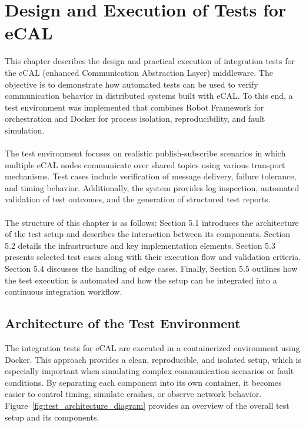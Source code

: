 \clearpage
\section{Design and Execution of Tests for eCAL}

This chapter describes the design and practical execution of integration tests for the eCAL (enhanced Communication Abstraction Layer) middleware. The objective is to demonstrate how automated tests can be used to verify communication behavior in distributed systems built with eCAL. To this end, a test environment was implemented that combines Robot Framework for orchestration and Docker for process isolation, reproducibility, and fault simulation.
\\
\\
The test environment focuses on realistic publish-subscribe scenarios in which multiple eCAL nodes communicate over shared topics using various transport mechanisms. Test cases include verification of message delivery, failure tolerance, and timing behavior. Additionally, the system provides log inspection, automated validation of test outcomes, and the generation of structured test reports.
\\
\\
The structure of this chapter is as follows: Section 5.1 introduces the architecture of the test setup and describes the interaction between its components. Section 5.2 details the infrastructure and key implementation elements. Section 5.3 presents selected test cases along with their execution flow and validation criteria. Section 5.4 discusses the handling of edge cases. Finally, Section 5.5 outlines how the test execution is automated and how the setup can be integrated into a continuous integration workflow.


\subsection{Architecture of the Test Environment}

The integration tests for eCAL are executed in a containerized environment using Docker. This approach provides a clean, reproducible, and isolated setup, which is especially important when simulating complex communication scenarios or fault conditions. By separating each component into its own container, it becomes easier to control timing, simulate crashes, or observe network behavior. Figure~\ref{fig:test_architecture_diagram} provides an overview of the overall test setup and its components.
 \\
 \\
 
